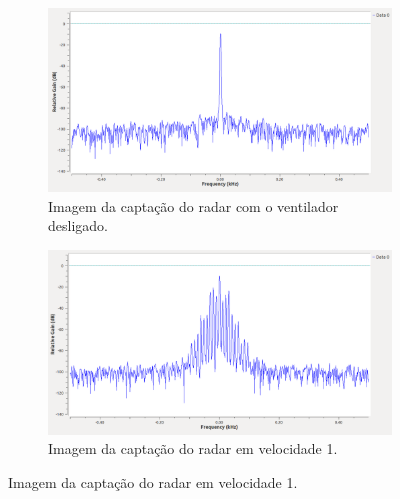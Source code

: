 \begin{figure}[H]

    \centering
      \begin{subfigure}{\textwidth}
        \includegraphics[scale=0.3]{figuras/Ventilador_desligado.png}
    \caption{Imagem da captação do radar com o ventilador desligado.}
    \label{Vel0}
      \end{subfigure}
      \hfill
      \begin{subfigure}{\textwidth}
       \includegraphics[scale=0.3]{figuras/Ventilador_vel1.png}
    \caption{Imagem da captação do radar em velocidade 1.}
    \label{Vel1}
      \end{subfigure}

\end{figure}

